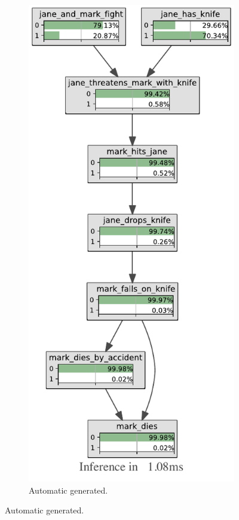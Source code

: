 \begin{figure}[htbp]
\begin{subfigure}{.4\textwidth}
\includegraphics[scale=0.7]{../experiments/VlekNetwork/bnImage/BNIMAGEKB2.pdf}
\caption{Automatic generated.}

\end{subfigure}
\end{figure}
